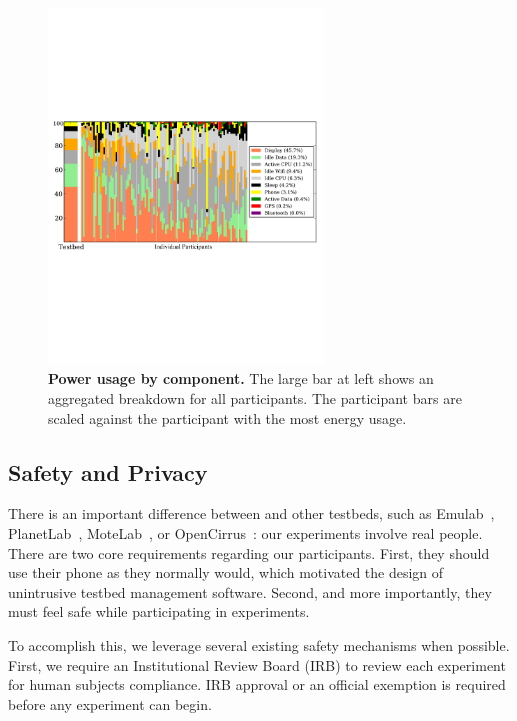\begin{figure}[t]

\centering
\includegraphics[width=0.65\textwidth]{./figures/power/breakdown/graph.pdf}

\caption{\textbf{Power usage by component.} The large bar at left shows an
aggregated breakdown for all participants. The participant bars are scaled
against the participant with the most energy usage.}

\vspace*{-0.1in}

\label{figure-batteryoverview}
\end{figure}

\subsection{Safety and Privacy}

There is an important difference between \PhoneLab{} and other testbeds, such
as Emulab~\cite{white:osdi:2002}, PlanetLab~\cite{peterson:ccr:2003},
MoteLab~\cite{werner-allen:ipsn:2005}, or
OpenCirrus~\cite{avetisyan:computer:2010}: our experiments involve real
people. There are two core requirements regarding our participants. First,
they should use their phone as they normally would, which motivated the
design of unintrusive testbed management software. Second, and more
importantly, they must feel safe while participating in \PhoneLab{}
experiments.

To accomplish this, we leverage several existing safety mechanisms when
possible. First, we require an Institutional Review Board (IRB) to review
each \PhoneLab{} experiment for human subjects compliance. IRB approval or an
official exemption is required before any \PhoneLab{} experiment can begin.

